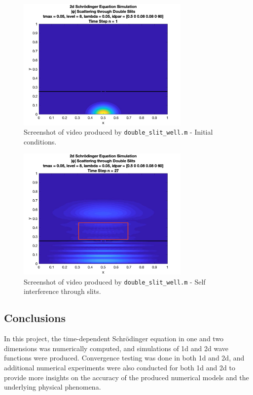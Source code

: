 \documentclass[10pt]{article}
\def\code#1{\texttt{#1}} %
\begin{document}
\begin{figure}[H]
\centering
\includegraphics[width=0.75\textwidth]{problem2/double_slit_1.png}
\caption{Screenshot of video produced by \code{double\_slit\_well.m} - Initial conditions.}
\end{figure}
\begin{figure}[H]
\centering
\includegraphics[width=0.75\textwidth]{problem2/double_slit_2.png}
\caption{Screenshot of video produced by \code{double\_slit\_well.m} - 
Self interference through slits.}
\end{figure}


\subsection*{Conclusions}

In this project, the time-dependent Schrödinger equation in one and two dimensions was numerically 
computed, and simulations of 1d and 2d wave functions were produced. Convergence testing was done 
in both 1d and 2d, and additional numerical experiments were also conducted for both 1d and 2d to 
provide more insights on the accuracy of the produced numerical models and the underlying physical 
phenomena. 
\end{document}
